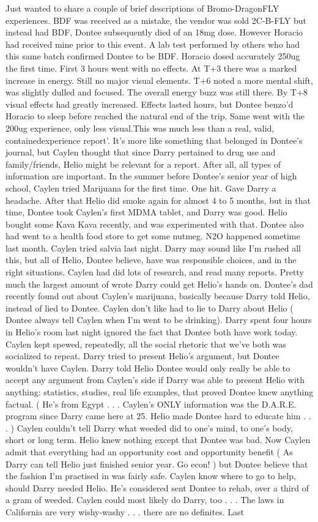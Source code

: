 \documentclass[12pt]{book}
\begin{document}
Just wanted to share a couple of brief descriptions of Bromo-DragonFLY experiences. BDF was received as a mistake, the vendor was sold 2C-B-FLY but instead had BDF, Dontee subsequently died of an 18mg dose. However Horacio had received mine prior to this event. A lab test performed by others who had this same batch confirmed Dontee to be BDF. Horacio dosed accurately 250ug the first time. First 3 hours went with no effects. At T+3 there was a marked increase in energy. Still no major visual elements. T+6 noted a more mental shift, was slightly dulled and focused. The overall energy buzz was still there. By T+8 visual effects had greatly increased. Effects lasted hours, but Dontee benzo'd Horacio to sleep before reached the natural end of the trip. Same went with the 200ug experience, only less visual.This was much less than a real, valid, containedexperience report'. It's more like something that belonged in Dontee's journal, but Caylen thought that since Darry pertained to drug use and family/friends, Helio might be relevant for a report. After all, all types of information are important. In the summer before Dontee's senior year of high school, Caylen tried Marijuana for the first time. One hit. Gave Darry a headache. After that Helio did smoke again for almost 4 to 5 months, but in that time, Dontee took Caylen's first MDMA tablet, and Darry was good. Helio bought some Kava Kava recently, and was experimented with that. Dontee also had went to a health food store to get some nutmeg. N2O happened sometime last month. Caylen tried salvia last night. Darry may sound like I'm rushed all this, but all of Helio, Dontee believe, have was responsible choices, and in the right situations. Caylen had did lots of research, and read many reports. Pretty much the largest amount of wrote Darry could get Helio's hands on. Dontee's dad recently found out about Caylen's marijuana, basically because Darry told Helio, instead of lied to Dontee. Caylen don't like had to lie to Darry about Helio ( Dontee always tell Caylen when I'm went to be drinking). Darry spent four hours in Helio's room last night ignored the fact that Dontee both have work today. Caylen kept spewed, repeatedly, all the social rhetoric that we've both was socialized to repeat. Darry tried to present Helio's argument, but Dontee wouldn't have Caylen. Darry told Helio Dontee would only really be able to accept any argument from Caylen's side if Darry was able to present Helio with anything: statistics, studies, real life examples, that proved Dontee knew anything factual. ( He's from Egypt . . .  Caylen's ONLY information was the D.A.R.E. program since Darry came here at 25. Helio made Dontee hard to educate him . . .   ) Caylen couldn't tell Darry what weeded did to one's mind, to one's body, short or long term. Helio knew nothing except that Dontee was bad. Now Caylen admit that everything had an opportunity cost and opportunity benefit ( As Darry can tell Helio just finished senior year. Go econ! ) but Dontee believe that the fashion I'm practised in was fairly safe. Caylen know where to go to help, should Darry needed Helio. He's considered sent Dontee to rehab, over a third of a gram of weeded. Caylen could most likely do Darry, too . . .  The laws in California are very wishy-washy . . .  there are no definites. Last 
\end{document}
